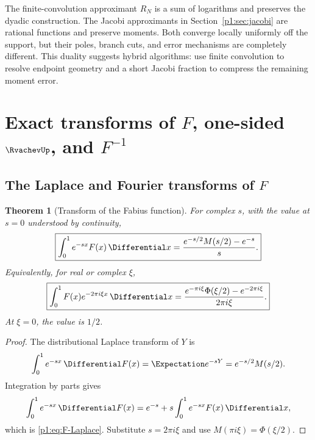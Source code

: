 \documentclass[11pt]{article}
\newtheorem{theorem}{Theorem}[section]
\theoremstyle{definition}
\theoremstyle{remark}
\begin{document}
\begin{remark}
The finite-convolution approximant \(R_N\) is a sum of logarithms and preserves the dyadic
construction.  The Jacobi approximants in Section~\ref{p1:sec:jacobi} are rational functions
and preserve moments.  Both converge locally uniformly off the support, but their poles,
branch cuts, and error mechanisms are completely different.  This duality suggests hybrid
algorithms: use finite convolution to resolve endpoint geometry and a short Jacobi fraction
to compress the remaining moment error.
\end{remark}

\section[Exact transforms of F, one-sided up, and inverse F]{Exact transforms of \(F\), one-sided \(\RvachevUp\), and \(F^{-1}\)}\label{p1:sec:fabius-transforms}

\subsection[The Laplace and Fourier transforms of F]{The Laplace and Fourier transforms of \(F\)}

\begin{theorem}[Transform of the Fabius function]\label{p1:thm:F-transform}
For complex \(s\), with the value at \(s=0\) understood by continuity,
\begin{equation}
 \boxed{
 \int_0^1 e^{-sx}F(x)\,\Differential x
 =\frac{e^{-s/2}M(s/2)-e^{-s}}{s}.
 }                                                           \label{p1:eq:F-Laplace}
\end{equation}
Equivalently, for real or complex \(\xi\),
\begin{equation}
 \boxed{
 \int_0^1F(x)e^{-2\pi i\xi x}\,\Differential x
 =\frac{e^{-\pi i\xi}\Phi(\xi/2)-e^{-2\pi i\xi}}{2\pi i\xi}.
 }                                                           \label{p1:eq:F-Fourier}
\end{equation}
At \(\xi=0\), the value is \(1/2\).
\end{theorem}

\begin{proof}
The distributional Laplace transform of \(Y\) is
\begin{equation}
 \int_0^1 e^{-sx}\,\Differential F(x)=\Expectation e^{-sY}=e^{-s/2}M(s/2).       \label{p1:eq:dF-Laplace}
\end{equation}
Integration by parts gives
\[
 \int_0^1e^{-sx}\,\Differential F(x)
 =e^{-s}+s\int_0^1e^{-sx}F(x)\,\Differential x,
\]
which is \eqref{p1:eq:F-Laplace}.  Substitute \(s=2\pi i\xi\) and use
\(M(\pi i\xi)=\Phi(\xi/2)\).
\end{proof}
\end{document}
